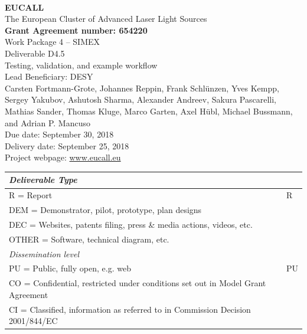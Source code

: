 \documentclass[10pt]{scrartcl}
\begin{document}
\makeatletter
\begin{titlepage}
\thispagestyle{scrheadings}
\begin{center}
$~$\\
\vspace{0cm}
{\Large\textbf{EUCALL}\\[2ex]
The European Cluster of Advanced Laser Light Sources}\\[4ex]
%
{\small\textbf{Grant Agreement number: 654220}}\\[6ex]
%
Work Package 4 -- SIMEX\\[3ex]
%
Deliverable D4.5\\
%
Testing, validation, and example workflow\\[4ex]
%
Lead Beneficiary: DESY\\[4ex]
%
Carsten Fortmann-Grote,
Johannes Reppin,
Frank Schl\"unzen,
Yves Kempp,
Sergey Yakubov,
Ashutosh Sharma,
Alexander Andreev,
Sakura Pascarelli,
Mathias Sander,
Thomas Kluge,
Marco Garten,
Axel H\"ubl,
Michael Bussmann,
and
Adrian P. Mancuso\\[4ex]
%
Due date: September 30, 2018\\
Delivery date: September 25, 2018 \\[4ex]
%
Project webpage: \url{www.eucall.eu}\\[6ex]
%
{%
\small
\begin{tabular}{|l|l|}
  \hline
  \multicolumn{2}{|l|}{ \textit{Deliverable Type} } \\
  \hline
  R = Report\hfill & R\\
  DEM = Demonstrator, pilot, prototype, plan designs & \\
  DEC = Websites, patents filing, press \& media actions, videos, etc. & \\
  OTHER = Software, technical diagram, etc. & \\
  \hline
  \multicolumn{2}{|l|}{\textit{Dissemination level}} \\
  \hline
  PU = Public, fully open, e.g. web & PU \\
  CO = Confidential, restricted under conditions set out in Model Grant
  Agreement\hspace*{17ex}\  & \\
  CI = Classified, information as referred to in Commission Decision 2001/844/EC
  & \\
  \hline
\end{tabular}
}

\end{center}
%
{}
\normalfont
\end{titlepage}
\makeatother
\end{document}
